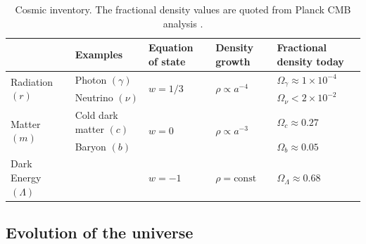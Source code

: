 \documentclass[a4paper,12pt,times,custombib,print,index]{Classes/PhDThesisPSnPDF} %
\begin{document}
\begin{table}[h]
	\caption{Cosmic inventory. The fractional density values are quoted from Planck CMB analysis \cite{PlanckCollaboration2018Parameters}.}
	\centering
	\label{table:cosmic_inventory}
	\renewcommand{\arraystretch}{1.5} 
	\begin{tabular}{m{} m{} m{}<{\centering} m{}<{\centering} m{}<{\centering} }
		\toprule
		& Examples & Equation \newline of state & Density growth & Fractional density today \\ 

		\midrule
		\multirow{2}{*}{Radiation $(r)$} & Photon $(\gamma)$ & \multirow{2}{*}{$w = 1/3$} & \multirow{2}{*}{$\rho \propto a^{-4}$} & $\Omega_{\gamma} \approx 1 \times 10^{-4}$ \\
		& Neutrino $(\nu)$ & & & $\Omega_{\nu} < 2 \times 10^{-2}$ \\

		\midrule	
		\multirow{2}{*}{Matter $(m)$} & Cold dark \newline matter $(c)$ & \multirow{2}{*}{$w = 0$} & \multirow{2}{*}{$\rho \propto a^{-3}$} & $\Omega_{c} \approx 0.27$ \\
		& Baryon $(b)$ & & & $\Omega_{b} \approx 0.05$ \\

		\midrule
		Dark Energy $(\Lambda)$ & & $w=-1$ & $\rho=\text{const}$  & $\Omega_\Lambda \approx 0.68$\\
		\bottomrule
	\end{tabular}
\end{table}


\subsection{Evolution of the universe}
\end{document}
